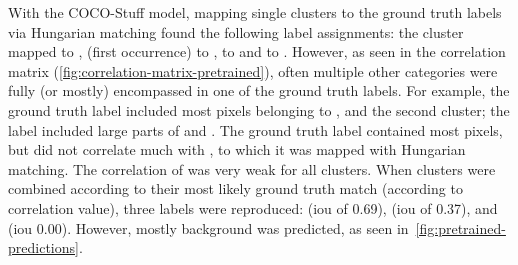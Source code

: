 With the COCO-Stuff model, mapping single clusters to the ground truth labels via Hungarian matching found the following label assignments: the  cluster mapped to ,  (first occurrence) to ,  to  and  to .
However, as seen in the correlation matrix (\autoref{fig:correlation-matrix-pretrained}), often multiple other categories were fully (or mostly) encompassed in one of the ground truth labels.
For example, the ground truth label  included most pixels belonging to , and the second  cluster;
the  label included large parts of  and .
The ground truth label  contained most  pixels, but did not correlate much with , to which it was mapped with Hungarian matching.
The correlation of  was very weak for all clusters.
When clusters were combined according to their most likely ground truth match (according to correlation value), three labels were reproduced:  (\gls{iou} of 0.69),  (\gls{iou} of 0.37), and  (\gls{iou} 0.00).
However, mostly background was predicted, as seen in~\autoref{fig:pretrained-predictions}.
